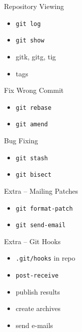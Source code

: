 \documentclass{beamer}
\begin{document}
\begin{frame}{Repository Viewing}
  \begin{itemize}
    \item \texttt{git log}
    \item \texttt{git show}
    \item gitk, gitg, tig
    \item tags
  \end{itemize}
\end{frame}

\begin{frame}{Fix Wrong Commit}
  \begin{itemize}
    \item \texttt{git rebase}
    \item \texttt{git amend}
  \end{itemize}
\end{frame}

\begin{frame}{Bug Fixing}
  \begin{itemize}
    \item \texttt{git stash}
    \item \texttt{git bisect}
  \end{itemize}
\end{frame}

\begin{frame}{Extra -- Mailing Patches}
  \begin{itemize}
    \item \texttt{git format-patch}
    \item \texttt{git send-email}
  \end{itemize}
\end{frame}

\begin{frame}{Extra -- Git Hooks}
  \begin{itemize}
    \item \texttt{.git/hooks} in repo
    \item \texttt{post-receive}
    \item publish results
    \item create archives
    \item send e-mails
  \end{itemize}
\end{frame}
\end{document}
